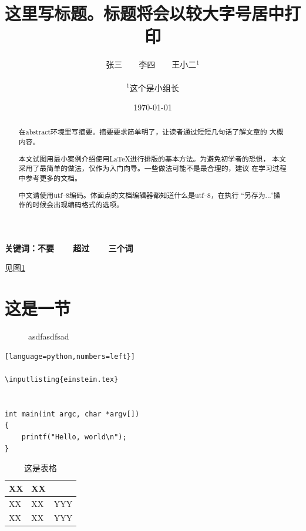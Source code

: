 \documentclass[12pt]{article}
\title{
    这里写标题。标题将会以较大字号居中打印
}
\author{
    张三~~~~李四~~~~王小二$^1$
 \\ \\
$^1$这个是小组长
}
\date{\today}
\begin{document}
\maketitle     %

\begin{abstract}
在abstract环境里写摘要。摘要要求简单明了，让读者通过短短几句话了解文章的
大概内容。

本文试图用最小案例介绍使用\LaTeX 进行排版的基本方法。为避免初学者的恐惧，
本文采用了最简单的做法，仅作为入门向导。一些做法可能不是最合理的，建议
在学习过程中参考更多的文档\cite{tex}。

中文请使用utf--8编码。体面点的文档编辑器都知道什么是utf--8，在执行
``另存为...''操作的时候会出现编码格式的选项。
  
\end{abstract}

\textbf{关键词：不要~~~~超过~~~~三个词}

见图\ref{XXXX} \pageref{XXXX}


\section{这是一节}
\fontsize{10}{10}\selectfont

\begin{figure}[htbp]
    \centering
{}

    \caption{asdfasdfsad}\label{XXXX}

\end{figure}


\begin{lstlisting}[language=python,numbers=left}]

\inputlisting{einstein.tex}


int main(int argc, char *argv[])
{
    printf("Hello, world\n");
}

\end{lstlisting}



\begin{table}[htbp]
\centering
\caption{这是表格}\label{tab:XXX}

\begin{tabular}{|l|l|c|}\hline
    XX & XX &        \\\hline
    XX & XX & YYY    \\\hline
    XX & XX & YYY    \\\cline{1-1} \cline{3-3}


\end{tabular}


\end{table}
\end{document}

